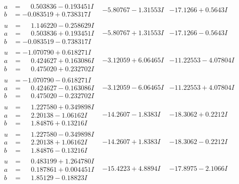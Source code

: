 \documentclass[1p]{elsarticle_modified}
\theoremstyle{definition}
\begin{document}
$$\begin{array}{c|c|c}
\begin{aligned}
a &= \phantom{-}0.503836 - 0.193451 I \\
b &= -0.083519 + 0.738317 I\end{aligned}
 & -5.80767 - 1.31553 I & -17.1266 + 0.5643 I \\ \hline\begin{aligned}
u &= \phantom{-}1.146220 - 0.258629 I \\
a &= \phantom{-}0.503836 + 0.193451 I \\
b &= -0.083519 - 0.738317 I\end{aligned}
 & -5.80767 + 1.31553 I & -17.1266 - 0.5643 I \\ \hline\begin{aligned}
u &= -1.070790 + 0.618271 I \\
a &= \phantom{-}0.424627 + 0.163086 I \\
b &= \phantom{-}0.475020 + 0.232702 I\end{aligned}
 & -3.12059 + 6.06465 I & -11.22553 - 4.07804 I \\ \hline\begin{aligned}
u &= -1.070790 - 0.618271 I \\
a &= \phantom{-}0.424627 - 0.163086 I \\
b &= \phantom{-}0.475020 - 0.232702 I\end{aligned}
 & -3.12059 - 6.06465 I & -11.22553 + 4.07804 I \\ \hline\begin{aligned}
u &= \phantom{-}1.227580 + 0.349898 I \\
a &= \phantom{-}2.20138 - 1.06162 I \\
b &= \phantom{-}1.84876 + 0.13216 I\end{aligned}
 & -14.2607 - 1.8383 I & -18.3062 + 0.2212 I \\ \hline\begin{aligned}
u &= \phantom{-}1.227580 - 0.349898 I \\
a &= \phantom{-}2.20138 + 1.06162 I \\
b &= \phantom{-}1.84876 - 0.13216 I\end{aligned}
 & -14.2607 + 1.8383 I & -18.3062 - 0.2212 I \\ \hline\begin{aligned}
u &= \phantom{-}0.483199 + 1.264780 I \\
a &= \phantom{-}0.187861 + 0.004451 I \\
b &= \phantom{-}1.85129 - 0.18823 I\end{aligned}
 & -15.4223 + 4.8894 I & -17.8975 - 2.1066 I \\ \hline\begin{aligned}

\end{aligned}
\end{array}$$
\end{document}
